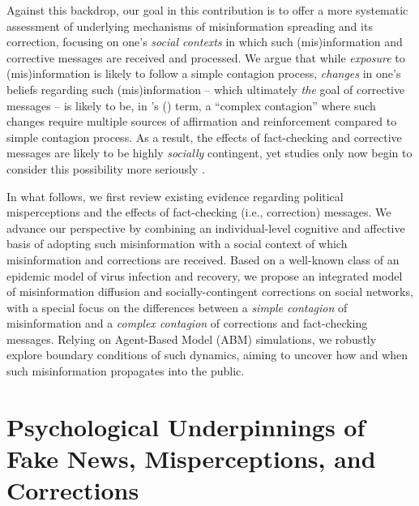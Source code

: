 \documentclass[man, 12pt, a4paper, nolmodern, noextraspace]{apa6}
\begin{document}
  Against this backdrop, our goal in this contribution is to offer a more systematic assessment of underlying mechanisms of misinformation spreading and its correction, focusing on one's \emph{social contexts} in which such (mis)information and corrective messages are received and processed. We argue that while \emph{exposure} to (mis)information is likely to follow a simple contagion process, \emph{changes} in one's beliefs regarding such (mis)information -- which ultimately \emph{the} goal of corrective messages -- is likely to be, in \citeauthor{centola2007complex}'s (\citeyear{centola2007complex}) term, a \enquote{complex contagion} where such changes require multiple sources of affirmation and reinforcement compared to simple contagion process. As a result, the effects of fact-checking and corrective messages are likely to be highly \emph{socially} contingent, yet studies only now begin to consider this possibility more seriously \parencite{margolin2017, bode2017see}.    
    
  In what follows, we first review existing evidence regarding political misperceptions and the effects of fact-checking (i.e., correction) messages. We advance our perspective by combining an individual-level cognitive and affective basis of adopting such misinformation with a social context of which misinformation and corrections are received. Based on a well-known class of an epidemic model of virus infection and recovery, we propose an integrated model of misinformation diffusion and socially-contingent corrections on social networks, with a special focus on the differences between a \emph{simple contagion} of misinformation and a \emph{complex contagion} of corrections and fact-checking messages. Relying on Agent-Based Model (ABM) simulations, we robustly explore boundary conditions of such dynamics, aiming to uncover how and when such misinformation propagates into the public.
    
\section{Psychological Underpinnings of Fake News, Misperceptions, and Corrections}
\end{document}
